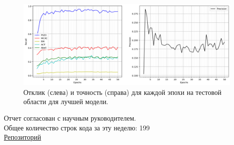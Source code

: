 \documentclass{article}
\begin{document}
\begin{figure}[h]
\includegraphics[width=0.8\linewidth]{recall2epoch}
\caption{Отклик (слева) и точность (справа) для каждой эпохи на тестовой области для лучшей модели.}
\label{Fig:Recall}
\end{figure}

Отчет согласован с научным руководителем.\\
Общее количество строк кода за эту неделю: 199\\
\href{https://github.com/rt2122/data-segmentation-2}{Репозиторий}\\ 
\end{document}
